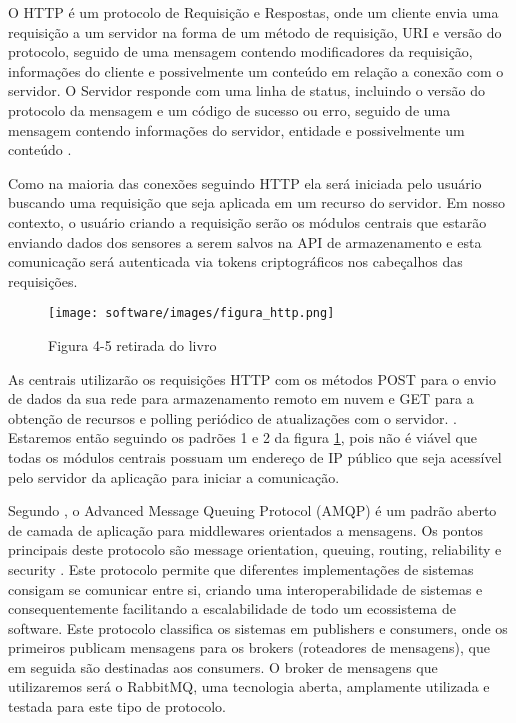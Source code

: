     O HTTP é um protocolo de Requisição e Respostas, onde um cliente envia uma requisição a um servidor na forma de um método de requisição, URI e versão do protocolo, seguido de uma mensagem contendo modificadores da requisição, informações do cliente e possivelmente um conteúdo em relação a conexão com o servidor. O Servidor responde com uma linha de status, incluindo o versão do protocolo da mensagem e um código de sucesso ou erro, seguido de uma mensagem contendo informações do servidor, entidade e possivelmente um conteúdo \cite{rfc}.

    Como na maioria das conexões seguindo HTTP ela será iniciada pelo usuário buscando uma requisição que seja aplicada em um recurso do servidor. Em nosso contexto, o usuário criando a requisição serão os módulos centrais que estarão enviando dados dos sensores a serem salvos na API de armazenamento e esta comunicação será autenticada via tokens criptográficos nos cabeçalhos das requisições.

    \begin{figure}[H]
        \texttt{[image: software/images/figura\_http.png]}
        \caption{Figura 4-5 retirada do livro \cite{pfister_2011}}
        \label{fig:http}
    \end{figure}

    As centrais utilizarão os requisições HTTP com os métodos POST para o envio de dados da sua rede para armazenamento remoto em nuvem e GET para a obtenção de recursos e polling periódico de atualizações com o servidor. \cite{pfister_2011}. Estaremos então seguindo os padrões 1 e 2 da figura \ref{fig:http}, pois não é viável que todas os módulos centrais possuam um endereço de IP público que seja acessível pelo servidor da aplicação para iniciar a comunicação.
    
    Segundo \cite{ohara_2007}, o Advanced Message Queuing Protocol (AMQP) é um padrão aberto de camada de aplicação para middlewares orientados a mensagens. Os pontos principais deste protocolo são message orientation, queuing, routing, reliability e security .
    Este protocolo permite que diferentes implementações de sistemas consigam se comunicar entre si, criando uma interoperabilidade de sistemas e consequentemente facilitando a escalabilidade de todo um ecossistema de software.
    Este protocolo classifica os sistemas em publishers e consumers, onde os primeiros publicam mensagens para os brokers (roteadores de mensagens), que em seguida são destinadas aos consumers.
    O broker de mensagens que utilizaremos será o RabbitMQ, uma tecnologia aberta, amplamente utilizada e testada para este tipo de protocolo.
    

